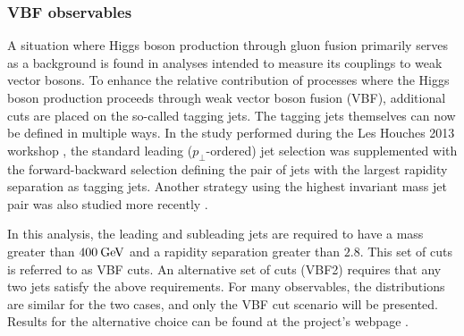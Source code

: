 \subsubsection{VBF observables}
\label{sec:hjetscomp:results:VBFobs}

A situation where Higgs boson production through gluon fusion primarily
serves as a background is found in analyses intended to measure its
couplings to weak vector bosons. To enhance the relative contribution
of processes where the Higgs boson production proceeds through weak
vector boson fusion (VBF), additional cuts are placed on the so-called
tagging jets. The tagging jets themselves can now be defined in
multiple ways. In the study performed during the Les Houches 2013
workshop \cite{AlcarazMaestre:2012vp}, the standard leading
($p_\perp$-ordered) jet selection was supplemented with the
forward-backward selection defining the pair of jets with the largest
rapidity separation as tagging jets. Another strategy using the
highest invariant mass jet pair was also studied more recently
\cite{Greiner:2015jha}.


In this analysis, the leading and subleading jets are required to have
a mass greater than $400\text{\:GeV}$ and a rapidity separation greater than
$2.8$. This set of cuts is referred to as VBF cuts. An alternative set
of cuts (VBF2) requires that any two jets satisfy the above
requirements. For many observables, the distributions are similar for
the two cases, and only the VBF cut scenario will be presented.
Results for the alternative choice can be found at the project's
webpage \cite{webpage}.

